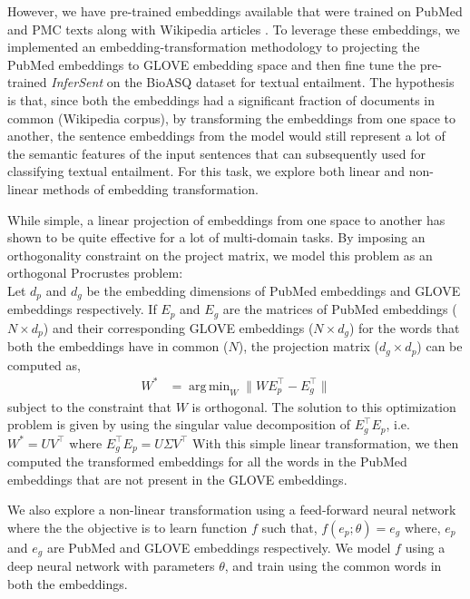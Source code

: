 \documentclass[11pt,a4paper]{article}
\DeclareMathOperator*{\argmin}{arg\,min}
\begin{document}
However, we have pre-trained embeddings available that were trained on PubMed and PMC texts along with Wikipedia articles \cite{biomed_embed}. To leverage these embeddings, we implemented an embedding-transformation methodology to projecting the PubMed embeddings to GLOVE embedding space and then fine tune the pre-trained \textit{InferSent} on the BioASQ dataset for textual entailment. The hypothesis is that, since both the embeddings had a significant fraction of documents in common (Wikipedia corpus), by transforming the embeddings from one space to another, the sentence embeddings from the model would still represent a lot of the semantic features of the input sentences that can subsequently used for classifying textual entailment. For this task, we explore both linear and non-linear methods of embedding transformation.

    While simple, a linear projection of embeddings from one space to another has shown to be quite effective for a lot of multi-domain tasks. By imposing an orthogonality constraint on the project matrix, we model this problem as an orthogonal Procrustes problem: \\
    Let $d_p$ and $d_g$ be the embedding dimensions of PubMed embeddings and GLOVE embeddings respectively.
    If $E_p$ and $E_g$ are the matrices of PubMed embeddings ($N \times d_p$) and their corresponding GLOVE embeddings ($N \times d_g$) for the words that both the embeddings have in common ($N$), the projection matrix ($d_g \times d_p$) can be computed as,
    \begin{align*}
        W^* &= \argmin_W \lVert  W E_p^{\intercal} - E_g^{\intercal} \rVert
    \end{align*}
    subject to the constraint that $W$ is orthogonal.
    The solution to this optimization problem is given by using the singular value decomposition of $E_g^{\intercal} E_p$, i.e.$  W^* = UV^{\intercal}$ where $E_g^{\intercal} E_p = U \Sigma V^{\intercal}$
    With this simple linear transformation, we then computed the transformed embeddings for all the words in the PubMed embeddings that are not present in the GLOVE embeddings. 

    We also explore a non-linear transformation using a feed-forward neural network where the the objective is to learn function $f$ such that, $f(e_p; \theta) = e_g$ where, $e_p$ and $e_g$ are PubMed and GLOVE embeddings respectively. We model $f$ using a deep neural network with parameters $\theta$, and train using the common words in both the embeddings. 
\end{document}
